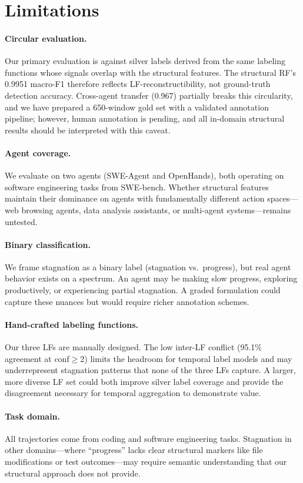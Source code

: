 \section*{Limitations}
\label{sec:limitations}

\paragraph{Circular evaluation.}
Our primary evaluation is against silver labels derived from the same labeling functions whose signals overlap with the structural features.
The structural RF's 0.9951 macro-F1 therefore reflects LF-reconstructibility, not ground-truth detection accuracy.
Cross-agent transfer (0.967) partially breaks this circularity, and we have prepared a 650-window gold set with a validated annotation pipeline; however, human annotation is pending, and all in-domain structural results should be interpreted with this caveat.

\paragraph{Agent coverage.}
We evaluate on two agents (SWE-Agent and OpenHands), both operating on software engineering tasks from SWE-bench.
Whether structural features maintain their dominance on agents with fundamentally different action spaces---web browsing agents, data analysis assistants, or multi-agent systems---remains untested.

\paragraph{Binary classification.}
We frame stagnation as a binary label (stagnation vs.\ progress), but real agent behavior exists on a spectrum.
An agent may be making slow progress, exploring productively, or experiencing partial stagnation.
A graded formulation could capture these nuances but would require richer annotation schemes.

\paragraph{Hand-crafted labeling functions.}
Our three LFs are manually designed.
The low inter-LF conflict (95.1\% agreement at conf${\geq}$2) limits the headroom for temporal label models and may underrepresent stagnation patterns that none of the three LFs capture.
A larger, more diverse LF set could both improve silver label coverage and provide the disagreement necessary for temporal aggregation to demonstrate value.

\paragraph{Task domain.}
All trajectories come from coding and software engineering tasks.
Stagnation in other domains---where ``progress'' lacks clear structural markers like file modifications or test outcomes---may require semantic understanding that our structural approach does not provide.
